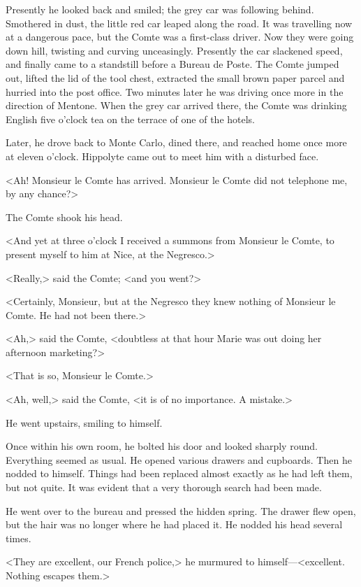 Presently he looked back and smiled; the grey car was following behind. Smothered in dust, the little red car leaped along the road. It was travelling now at a dangerous pace, but the Comte was a first-class driver. Now they were going down hill, twisting and curving unceasingly. Presently the car slackened speed, and finally came to a standstill before a Bureau de Poste. The Comte jumped out, lifted the lid of the tool chest, extracted the small brown paper parcel and hurried into the post office. Two minutes later he was driving once more in the direction of Mentone. When the grey car arrived there, the Comte was drinking English five o'clock tea on the terrace of one of the hotels.

Later, he drove back to Monte Carlo, dined there, and reached home once more at eleven o'clock. Hippolyte came out to meet him with a disturbed face.

<Ah! Monsieur le Comte has arrived. Monsieur le Comte did not telephone me, by any chance?>

The Comte shook his head.

<And yet at three o'clock I received a summons from Monsieur le Comte, to present myself to him at Nice, at the Negresco.>

<Really,> said the Comte; <and you went?>

<Certainly, Monsieur, but at the Negresco they knew nothing of Monsieur le Comte. He had not been there.>

<Ah,> said the Comte, <doubtless at that hour Marie was out doing her afternoon marketing?>

<That is so, Monsieur le Comte.>

<Ah, well,> said the Comte, <it is of no importance. A mistake.>

He went upstairs, smiling to himself.

Once within his own room, he bolted his door and looked sharply round. Everything seemed as usual. He opened various drawers and cupboards. Then he nodded to himself. Things had been replaced almost exactly as he had left them, but not quite. It was evident that a very thorough search had been made.

He went over to the bureau and pressed the hidden spring. The drawer flew open, but the hair was no longer where he had placed it. He nodded his head several times.

<They are excellent, our French police,> he murmured to himself—<excellent. Nothing escapes them.>